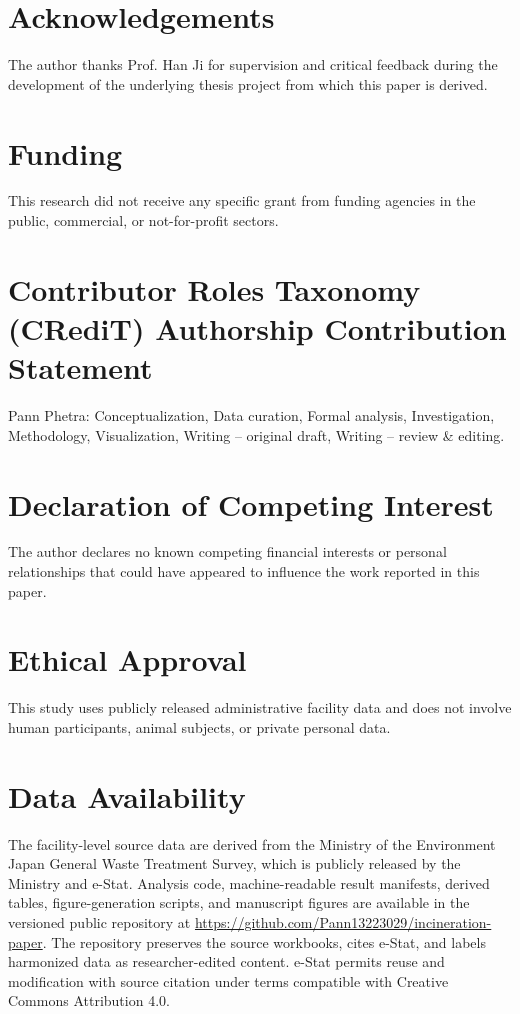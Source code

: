\documentclass[11pt,letterpaper]{article}
\begin{document}
\section*{Acknowledgements}

The author thanks Prof. Han Ji for supervision and critical feedback during the
development of the underlying thesis project from which this paper is derived.

\section*{Funding}

This research did not receive any specific grant from funding agencies in the
public, commercial, or not-for-profit sectors.

\section*{Contributor Roles Taxonomy (CRediT) Authorship Contribution Statement}

Pann Phetra: Conceptualization, Data curation, Formal analysis, Investigation,
Methodology, Visualization, Writing -- original draft, Writing -- review \&
editing.

\section*{Declaration of Competing Interest}

The author declares no known competing financial interests or personal
relationships that could have appeared to influence the work reported in this
paper.

\section*{Ethical Approval}

This study uses publicly released administrative facility data and does not
involve human participants, animal subjects, or private personal data.

\section*{Data Availability}

The facility-level source data are derived from the Ministry of the Environment
Japan General Waste Treatment Survey, which is publicly released by the
Ministry and e-Stat. Analysis code, machine-readable result manifests, derived
tables, figure-generation scripts, and manuscript figures are available in the
versioned public repository at
\url{https://github.com/Pann13223029/incineration-paper}. The repository
preserves the source workbooks, cites e-Stat, and labels harmonized data as
researcher-edited content. e-Stat permits reuse and modification with source
citation under terms compatible with Creative Commons Attribution 4.0.
\end{document}
